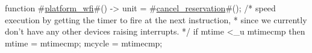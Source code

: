 function #\hyperref[sailRISCVzplatformzywfi]{platform\_wfi}#() -> unit = {
  #\hyperref[sailRISCVzcancelzyreservation]{cancel\_reservation}#();
  /* speed execution by getting the timer to fire at the next instruction,
   * since we currently don't have any other devices raising interrupts.
   */
  if mtime <_u mtimecmp then {
    mtime  = mtimecmp;
    mcycle = mtimecmp;
  }
}
